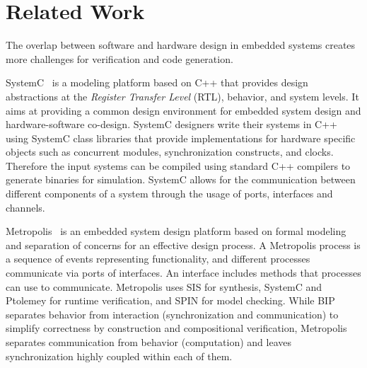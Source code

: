 \section{Related Work}
\label{sec:related}
%
The overlap between software and hardware design in embedded systems creates more challenges 
for verification and code generation. 

SystemC~\cite{systemc} is a modeling platform based on C++ that provides
design abstractions at the {\em Register Transfer Level} (RTL), behavior, and system levels. 
It aims at providing a common design environment for embedded system design and hardware-software
co-design. SystemC designers write their systems in C++ using SystemC class libraries that 
provide implementations for hardware specific objects such as concurrent modules, synchronization constructs,
and clocks.
Therefore the input systems can be compiled using standard C++ compilers to generate binaries
for simulation. SystemC allows for the communication between different components of a system
through the usage of ports, interfaces and channels.  

Metropolis~\cite{metropolis1,metropolis2} is an embedded system design platform based on 
formal modeling and separation of concerns for an effective
design process.%
A Metropolis process is a sequence of events representing
functionality, and different processes communicate via ports of interfaces.%
An interface includes methods that processes can use to communicate. 
Metropolis uses SIS for synthesis, SystemC and Ptolemey for runtime verification, and SPIN for model checking.
While BIP separates behavior from interaction (synchronization and communication) to simplify correctness by construction
and compositional verification, Metropolis separates communication from behavior (computation) and leaves synchronization 
highly coupled within each of them. 


